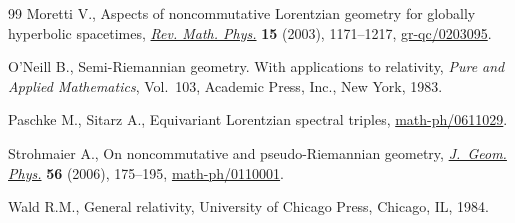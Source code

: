 \documentclass[pdftex]{sigma}
\begin{document}
\begin{thebibliography}{99}
Moretti V.,
Aspects of noncommutative Lorentzian geometry for globally hyperbolic spacetimes,
\href{http://dx.doi.org/10.1142/S0129055X03001886}{{\it Rev. Math. Phys.}} {\bf 15} (2003), 1171--1217,
\href{http://arxiv.org/abs/gr-qc/0203095}{gr-qc/0203095}.

O'Neill B.,
Semi-Riemannian geometry. With applications to relativity,
 {\it Pure and Applied Mathematics}, Vol.~103, Academic Press, Inc., New York, 1983.

Paschke M., Sitarz A.,
Equivariant Lorentzian spectral triples,
\href{http://arxiv.org/abs/math-ph/0611029}{math-ph/0611029}.

Strohmaier A.,
On noncommutative and pseudo-Riemannian geometry,
\href{http://dx.doi.org/10.1016/j.geomphys.2005.01.005}{{\it J.~Geom. Phys.}} {\bf 56} (2006), 175--195,
\href{http://arxiv.org/abs/math-ph/0110001}{math-ph/0110001}.

Wald R.M.,
General relativity,  University of Chicago Press, Chicago, IL, 1984.

\end{thebibliography}\LastPageEnding
\end{document}
